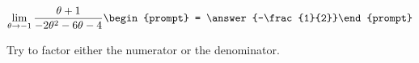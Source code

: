 \documentclass{ximera}
\author{Bart Snapp}
\begin{document}
\begin{exercise}

\[
\lim_{\theta\to -1 } \frac{\theta +1}{-2 \theta ^2-6 \theta -4}\begin{prompt} = \answer{-\frac{1}{2}}\end{prompt}
\]
\begin{hint}
Try to factor either the numerator or the denominator.
\end{hint}
\end{exercise}
\end{document}
